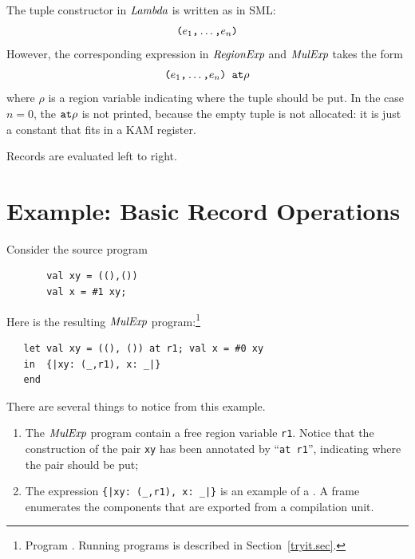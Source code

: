 \documentclass[12pt]{book}
\begin{document}
The tuple constructor in $\hbox{\it Lambda}$ is written as in SML:
$$\hbox{\tt (}e_1\hbox{\tt ,}\ldots\hbox{\tt ,}e_n\hbox{\tt )}$$
However, the corresponding expression in $\hbox{\it RegionExp}$ and $\hbox{\it MulExp}$ takes the form
$$\hbox{\tt (}e_1\hbox{\tt ,}\ldots\hbox{\tt ,}e_n\hbox{\tt ) at}\rho$$
where $\rho$ is a region variable indicating where the tuple should be put.
In the case $n=0$,  the $\mathbin{\hbox{\tt at}}\rho$ is not printed, because the empty tuple is not
allocated: it is just a constant that fits in a KAM register.

Records are evaluated left to right.

\section{Example: Basic Record Operations}
\label{proj.ex}
Consider the source program
\begin{verbatim}
       val xy = ((),()) 
       val x = #1 xy;
\end{verbatim}
Here is the resulting $\hbox{\it MulExp}$ program:\footnote{Program
  . Running programs is described in
  Section~\ref{tryit.sec}.}
\begin{verbatim}
   let val xy = ((), ()) at r1; val x = #0 xy
   in  {|xy: (_,r1), x: _|}
   end 
\end{verbatim}
There are several things to notice from this example. 
\begin{enumerate}
\item The $\hbox{\it MulExp}$ program contain a free region variable
      {\tt r1}. Notice that the construction of the
      pair {\tt xy} has been annotated by ``{\tt at r1}'', indicating
      where the pair should be put;
\item The expression \verb+{|xy: (_,r1), x: _|}+ is
      an example of a . A frame enumerates
      the components that are exported from a compilation unit.
\end{enumerate}
\end{document}
